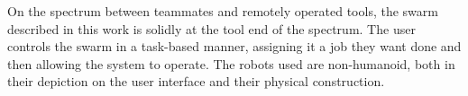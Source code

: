 On the spectrum between teammates and remotely operated tools, the swarm described in this work is solidly at the tool end of the spectrum. 
The user controls the swarm in a task-based manner, assigning it a job they want done and then allowing the system to operate.
The robots used are non-humanoid, both in their depiction on the user interface and their physical construction. 

